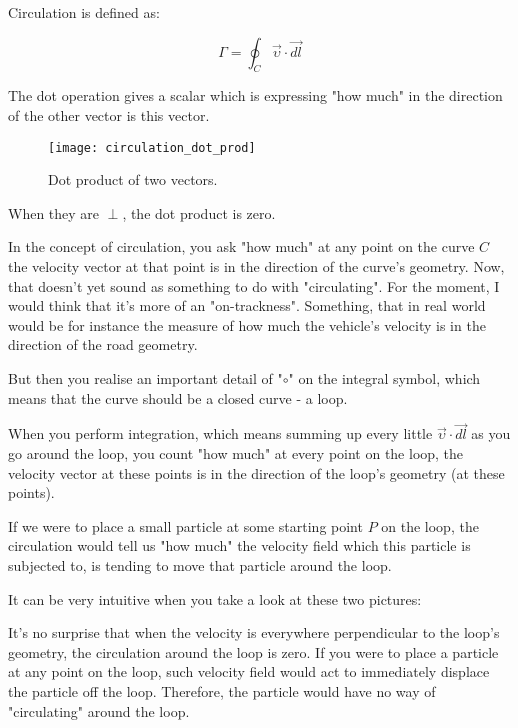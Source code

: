 

Circulation is defined as:

\begin{equation}
\Gamma = \oint_C \vec{\upsilon} \cdot \vec{dl}
\end{equation}

The dot operation gives a scalar which is expressing "how much" in the direction of the other vector is this vector.

\begin{figure}[H]
\centering\texttt{[image: circulation\_dot\_prod]}
\caption{Dot product of two vectors.}			
\label{fig:learning_curve}
\end{figure}

When they are $\perp$, the dot product is zero.

In the concept of circulation, you ask "how much" at any point on the curve $C$ the velocity vector at that point is in the direction of the curve's geometry. Now, that doesn't yet sound as something to do with "circulating". For the moment, I would think that it's more of an "on-trackness". Something, that in real world would be for instance the measure of how much the vehicle's velocity is in the direction of the road geometry.

But then you realise an important detail of "$\circ$" on the integral symbol, which means that the curve should be a closed curve - a loop.

When you perform integration, which means summing up every little $\vec{\upsilon} \cdot \vec{dl}$ as you go around the loop, you count "how much" at every point on the loop, the velocity vector at these points is in the direction of the loop's geometry (at these points).

If we were to place a small particle at some starting point $P$ on the loop, the circulation would tell us "how much" the velocity field which this particle is subjected to, is tending to move that particle around the loop.

It can be very intuitive when you take a look at these two pictures:



It's no surprise that when the velocity is everywhere perpendicular to the loop's geometry, the circulation around the loop is zero. If you were to place a particle at any point on the loop, such velocity field would act to immediately displace the particle off the loop. Therefore, the particle would have no way of "circulating" around the loop.

